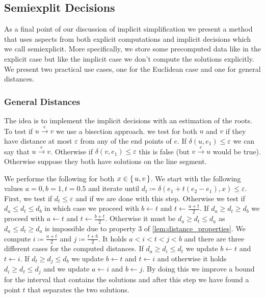 \subsection{Semiexplit Decisions}
As a final point of our discussion of implicit simplification we present a method that uses aspects from both explicit computations and implicit decisions which we call semiexplicit. More specifically, we store some precomputed data like in the explicit case but like the implicit case we don't compute the solutions explicitly. We present two practical use cases, one for the Euclidean case and one for general distances. 

\subsubsection{General Distances}

The idea is to implement the implicit decisions with an estimation of the roots. To test if \(u \overset e\rightarrow v\) we use a bisection approach. we test for both \(u\) and \(v\) if they have distance at most \(\varepsilon\) from any of the end points of \(e\). If \(\delta(u, e_1) \leq \varepsilon\) we can say that \(u \overset e\rightarrow v\). Otherwise if \(\delta(v, e_1) \leq \varepsilon\) this is false (but \(v \overset e\rightarrow u\) would be true). Otherwise suppose they both have solutions on the line segment. 

We performe the following for both \(x \in \set{u, v}\). We start with the following values \(a = 0, b = 1, t = 0.5\) and iterate  until \(d_t \coloneq \delta(e_1 + t(e_2 - e_1), x) \leq \varepsilon\). 
First, we test if \(d_t \leq \varepsilon\) and if we are done with this step. Otherwise we test if \(d_a \leq d_t \leq d_b\) in which case we proceed with \(b \gets t\) and \(t \gets \frac{a + t}2\). If \(d_a \geq d_t \geq d_b\) we proceed with \(a \gets t\) and \(t \gets \frac{b + t}2\). Otherwise it must be \(d_a \geq d_t \leq d_a\) as \(d_a \leq d_t \geq d_a\) is impossible due to property 3 of \cref{lem:distance_properties}.
We compute \(i \coloneq \frac{a + t}2\) and \(j \coloneq \frac{t + b}2\). It holds \(a < i < t < j < b\) and there are three different cases for the computed distances. If \(d_a \geq d_i \leq d_t\) we update \(b \gets t\) and \(t \gets i\). If \(d_t \geq d_j \leq d_b\) we update \(b \gets t\) and \(t \gets i\) and otherwise it holds \(d_i \geq d_t \leq d_j\) and we update \(a \gets i\) and \(b \gets j\). By doing this we improve a bound for the interval that contains the solutions and after this step we have found a point \(t\) that separates the two solutions. 


